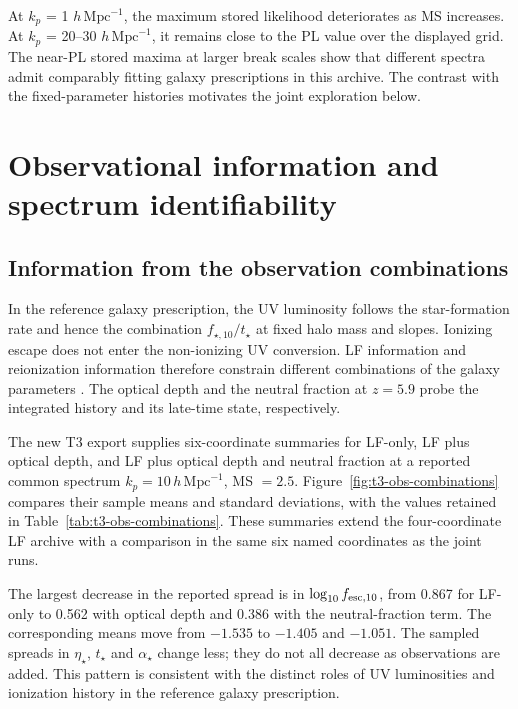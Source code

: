 At \ensuremath{k_p} = 1 $h\,\mathrm{Mpc}^{-1}$, the maximum stored likelihood deteriorates as MS increases. At \ensuremath{k_p} = 20--30 $h\,\mathrm{Mpc}^{-1}$, it remains close to the PL value over the displayed grid. The near-PL stored maxima at larger break scales show that different spectra admit comparably fitting galaxy prescriptions in this archive. The contrast with the fixed-parameter histories motivates the joint exploration below.

\section{Observational information and spectrum identifiability}\label{inference-status}

\subsection{Information from the observation combinations}\label{observation-combinations}

In the reference galaxy prescription, the UV luminosity follows the star-formation rate and hence the combination $f_{\star,10}/t_\star$ at fixed halo mass and slopes. Ionizing escape does not enter the non-ionizing UV conversion. LF information and reionization information therefore constrain different combinations of the galaxy parameters \cite{Park2019}. The optical depth and the neutral fraction at $z=5.9$ probe the integrated history and its late-time state, respectively.

The new T3 export supplies six-coordinate summaries for LF-only, LF plus optical depth, and LF plus optical depth and neutral fraction at a reported common spectrum $k_p=10\,h\,\mathrm{Mpc}^{-1}$, MS $=2.5$. Figure~\ref{fig:t3-obs-combinations} compares their sample means and standard deviations, with the values retained in Table~\ref{tab:t3-obs-combinations}. These summaries extend the four-coordinate LF archive with a comparison in the same six named coordinates as the joint runs.

The largest decrease in the reported spread is in $\log_{10}f_{{\rm esc},10}$, from 0.867 for LF-only to 0.562 with optical depth and 0.386 with the neutral-fraction term. The corresponding means move from $-1.535$ to $-1.405$ and $-1.051$. The sampled spreads in $\eta_\star$, $t_\star$ and $\alpha_\star$ change less; they do not all decrease as observations are added. This pattern is consistent with the distinct roles of UV luminosities and ionization history in the reference galaxy prescription.

